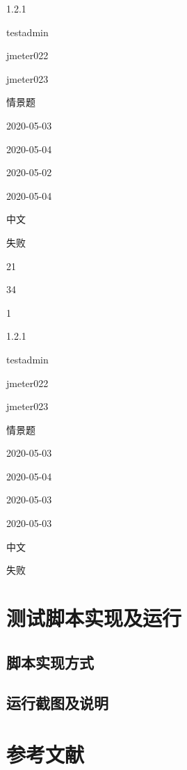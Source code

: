 \documentclass[hyperref, a4paper]{ctexart}
\begin{document}
1.2.1

testadmin

jmeter022

jmeter023

情景题

2020-05-03

2020-05-04

2020-05-02

2020-05-04

中文

失败

21

34

1

1.2.1

testadmin

jmeter022

jmeter023

情景题

2020-05-03

2020-05-04

2020-05-03

2020-05-03

中文

失败

\hypertarget{ux6d4bux8bd5ux811aux672cux5b9eux73b0ux53caux8fd0ux884c}{%
\section{测试脚本实现及运行}\label{ux6d4bux8bd5ux811aux672cux5b9eux73b0ux53caux8fd0ux884c}}

\hypertarget{ux811aux672cux5b9eux73b0ux65b9ux5f0f}{%
\subsection{脚本实现方式}\label{ux811aux672cux5b9eux73b0ux65b9ux5f0f}}

\hypertarget{ux8fd0ux884cux622aux56feux53caux8bf4ux660e}{%
\subsection{运行截图及说明}\label{ux8fd0ux884cux622aux56feux53caux8bf4ux660e}}

\pagebreak

\hypertarget{ux53c2ux8003ux6587ux732e}{%
\section*{参考文献}\label{ux53c2ux8003ux6587ux732e}}
\end{document}
